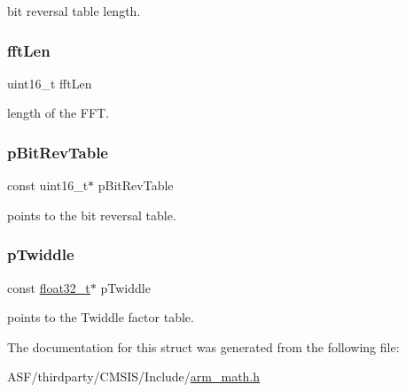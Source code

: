 bit reversal table length. \mbox{\label{structarm__cfft__instance__f32_ab8db3bbe7c61e6bb8ca2a55e3446e11a}} 
\subsubsection{\texorpdfstring{fftLen}{fftLen}}
{\footnotesize\ttfamily uint16\+\_\+t fft\+Len}

length of the F\+FT. \mbox{\label{structarm__cfft__instance__f32_a3b229432d381b0a511a9cdbe3aa74e78}} 
\subsubsection{\texorpdfstring{pBitRevTable}{pBitRevTable}}
{\footnotesize\ttfamily const uint16\+\_\+t$\ast$ p\+Bit\+Rev\+Table}

points to the bit reversal table. \mbox{\label{structarm__cfft__instance__f32_a8292d9775f5c5472f59915649fe3b378}} 
\subsubsection{\texorpdfstring{pTwiddle}{pTwiddle}}
{\footnotesize\ttfamily const \mbox{\hyperlink{arm__math_8h_a4611b605e45ab401f02cab15c5e38715}{float32\+\_\+t}}$\ast$ p\+Twiddle}

points to the Twiddle factor table. 

The documentation for this struct was generated from the following file\+:\begin{DoxyCompactItemize}
\item 
A\+S\+F/thirdparty/\+C\+M\+S\+I\+S/\+Include/\mbox{\hyperlink{arm__math_8h}{arm\+\_\+math.\+h}}\end{DoxyCompactItemize}

